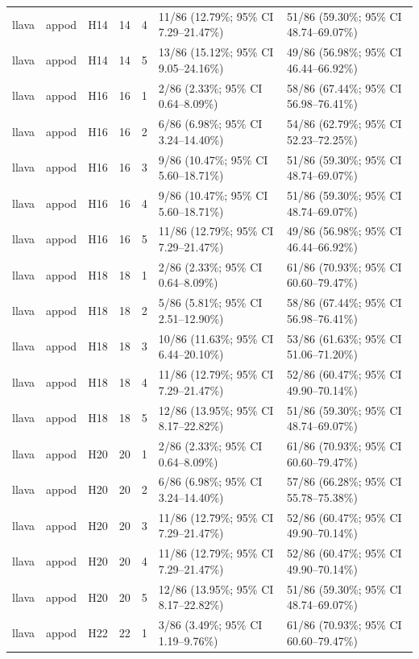 \begin{longtable}{lllrrll}
llava & appod & H14 & 14 & 4 & 11/86 (12.79\%; 95\% CI 7.29–21.47\%) & 51/86 (59.30\%; 95\% CI 48.74–69.07\%) \\
llava & appod & H14 & 14 & 5 & 13/86 (15.12\%; 95\% CI 9.05–24.16\%) & 49/86 (56.98\%; 95\% CI 46.44–66.92\%) \\
llava & appod & H16 & 16 & 1 & 2/86 (2.33\%; 95\% CI 0.64–8.09\%) & 58/86 (67.44\%; 95\% CI 56.98–76.41\%) \\
llava & appod & H16 & 16 & 2 & 6/86 (6.98\%; 95\% CI 3.24–14.40\%) & 54/86 (62.79\%; 95\% CI 52.23–72.25\%) \\
llava & appod & H16 & 16 & 3 & 9/86 (10.47\%; 95\% CI 5.60–18.71\%) & 51/86 (59.30\%; 95\% CI 48.74–69.07\%) \\
llava & appod & H16 & 16 & 4 & 9/86 (10.47\%; 95\% CI 5.60–18.71\%) & 51/86 (59.30\%; 95\% CI 48.74–69.07\%) \\
llava & appod & H16 & 16 & 5 & 11/86 (12.79\%; 95\% CI 7.29–21.47\%) & 49/86 (56.98\%; 95\% CI 46.44–66.92\%) \\
llava & appod & H18 & 18 & 1 & 2/86 (2.33\%; 95\% CI 0.64–8.09\%) & 61/86 (70.93\%; 95\% CI 60.60–79.47\%) \\
llava & appod & H18 & 18 & 2 & 5/86 (5.81\%; 95\% CI 2.51–12.90\%) & 58/86 (67.44\%; 95\% CI 56.98–76.41\%) \\
llava & appod & H18 & 18 & 3 & 10/86 (11.63\%; 95\% CI 6.44–20.10\%) & 53/86 (61.63\%; 95\% CI 51.06–71.20\%) \\
llava & appod & H18 & 18 & 4 & 11/86 (12.79\%; 95\% CI 7.29–21.47\%) & 52/86 (60.47\%; 95\% CI 49.90–70.14\%) \\
llava & appod & H18 & 18 & 5 & 12/86 (13.95\%; 95\% CI 8.17–22.82\%) & 51/86 (59.30\%; 95\% CI 48.74–69.07\%) \\
llava & appod & H20 & 20 & 1 & 2/86 (2.33\%; 95\% CI 0.64–8.09\%) & 61/86 (70.93\%; 95\% CI 60.60–79.47\%) \\
llava & appod & H20 & 20 & 2 & 6/86 (6.98\%; 95\% CI 3.24–14.40\%) & 57/86 (66.28\%; 95\% CI 55.78–75.38\%) \\
llava & appod & H20 & 20 & 3 & 11/86 (12.79\%; 95\% CI 7.29–21.47\%) & 52/86 (60.47\%; 95\% CI 49.90–70.14\%) \\
llava & appod & H20 & 20 & 4 & 11/86 (12.79\%; 95\% CI 7.29–21.47\%) & 52/86 (60.47\%; 95\% CI 49.90–70.14\%) \\
llava & appod & H20 & 20 & 5 & 12/86 (13.95\%; 95\% CI 8.17–22.82\%) & 51/86 (59.30\%; 95\% CI 48.74–69.07\%) \\
llava & appod & H22 & 22 & 1 & 3/86 (3.49\%; 95\% CI 1.19–9.76\%) & 61/86 (70.93\%; 95\% CI 60.60–79.47\%) \\

\end{longtable}
